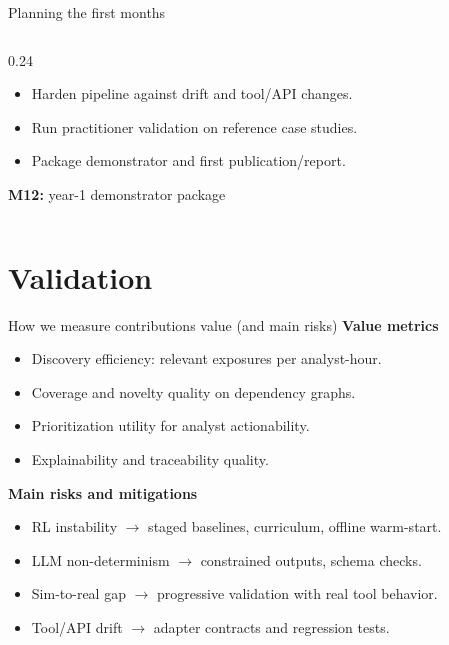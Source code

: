 \documentclass[10pt,aspectratio=169]{beamer}
\begin{document}
\begin{frame}{Planning the first months}
\begin{columns}[T]
\begin{column}{0.24\textwidth}
\begin{itemize}
                \item Harden pipeline against drift and tool/API changes.
                \item Run practitioner validation on reference case studies.
                \item Package demonstrator and first publication/report.
            \end{itemize}
            \textbf{M12:} year-1 demonstrator package
        \end{column}
    \end{columns}
\end{frame}

\section{Validation}
\begin{frame}{How we measure contributions value (and main risks)}
    \textbf{Value metrics}
    \begin{itemize}
        \item Discovery efficiency: relevant exposures per analyst-hour.
        \item Coverage and novelty quality on dependency graphs.
        \item Prioritization utility for analyst actionability.
        \item Explainability and traceability quality.
    \end{itemize}

    \textbf{Main risks and mitigations}
    \begin{itemize}
        \item RL instability \(\rightarrow\) staged baselines, curriculum, offline warm-start.
        \item LLM non-determinism \(\rightarrow\) constrained outputs, schema checks.
        \item Sim-to-real gap \(\rightarrow\) progressive validation with real tool behavior.
        \item Tool/API drift \(\rightarrow\) adapter contracts and regression tests.
    \end{itemize}
\end{frame}
\end{document}
